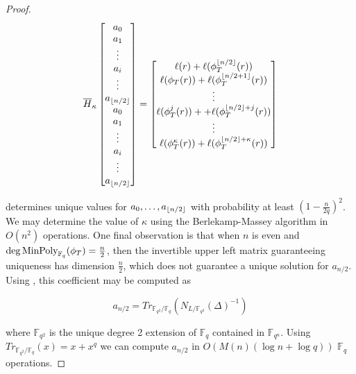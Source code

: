 \documentclass{acmart}
\theoremstyle{remark}
\numberwithin{equation}{section}
\newcommand{\minpol}{\textnormal{MinPoly}_{\mathbb{F}_q}}
\DeclarePairedDelimiter\floor{\lfloor}{\rfloor}
\begin{document}
\begin{proof}
\[\overline{H}_{\kappa}\begin{bmatrix} a_0 \\ a_1 \\ \vdots \\ a_i \\ \vdots \\ a_{\floor*{n/2}} \\ a_0 \\ a_1 \\ \vdots \\ a_i \\ \vdots \\ a_{\floor*{n/2}} \end{bmatrix} = 
\begin{bmatrix} \ell(r) + \ell(\phi_T^{\floor*{n/2}}(r)) \\ \ell(\phi_T(r)) + \ell(\phi_T^{\floor*{n/2 + 1}}(r))  \\ \vdots \\ \ell(\phi_T^j(r)) + + \ell(\phi_T^{\floor*{n/2} + j}(r))  \\ \vdots  \\   \ell(\phi_T^{\kappa}(r)) + \ell(\phi_T^{\floor*{n/2} + \kappa}(r))  \end{bmatrix} \]

\noindent determines unique values for $a_0, \ldots, a_{\floor*{n/2}}$ with probability at least $(1 - \frac{n}{2q})^2$. We may determine the value of $\kappa$ using the Berlekamp-Massey algorithm in $O(n^2)$ operations. One final observation is that when $n$ is even and $\deg \minpol(\phi_T) = \frac{n}{2}$, then the invertible upper left matrix guaranteeing uniqueness has dimension $\frac{n}{2}$, which does not guarantee a unique solution for $a_{n/2}$. Using \cite[proposition 2.14]{frobdist}, this coefficient may be computed as

\[a_{n/2} = Tr_{\mathbb{F}_{q^2}/\mathbb{F}_{q}}(N_{L/\mathbb{F}_{q^2}}(\Delta)^{-1})\]

\noindent where $\mathbb{F}_{q^2}$ is the unique degree 2 extension of $\mathbb{F}_q$ contained in $\mathbb{F}_{q^n}$. Using $Tr_{\mathbb{F}_{q^2}/\mathbb{F}_{q}}(x) = x + x^q$ we can compute $a_{n/2}$ in $O(M(n)(\log n + \log q))$ $\mathbb{F}_q$ operations.





\end{proof}
\end{document}
